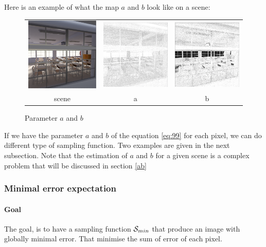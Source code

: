\documentclass{classeENS}
\begin{document}
Here is an example of what the map $a$ and $b$ look like on a scene:
\begin{figure}[H]
    \centering
    \caption{Parameter $a$ and $b$}
    \label{fig:a}
    \begin{tabular}{ccc}
    \includegraphics[width=45mm]{image/without/gt.png}
    & \includegraphics[width=45mm]{image/without/a.png}
    & \includegraphics[width=45mm]{image/without/b.png} \\
    scene & a & b
    \end{tabular}
\end{figure}

If we have the parameter $a$ and $b$ of the equation \ref{eq:99} for each pixel, 
we can do different type of sampling function. Two examples are given in 
the next subsection. Note that the estimation of $a$ and $b$ for a given scene
is a complex problem that will be discussed in section \ref{ab}


\subsubsection{Minimal error expectation}
\paragraph*{Goal} The goal, is to have a sampling function $\mathcal S_{min}$ that produce
 an image with globally minimal error. That minimise the sum of error of each pixel.
\end{document}
